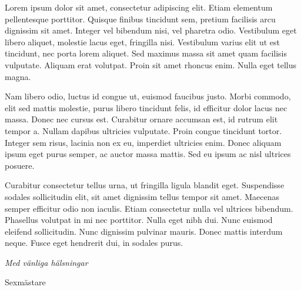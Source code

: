 \documentclass[../main/handlingar.tex]{subfiles}
\begin{document}

Lorem ipsum dolor sit amet, consectetur adipiscing elit. Etiam elementum pellentesque porttitor. Quisque finibus tincidunt sem, pretium facilisis arcu dignissim sit amet. Integer vel bibendum nisi, vel pharetra odio. Vestibulum eget libero aliquet, molestie lacus eget, fringilla nisi. Vestibulum varius elit ut est tincidunt, nec porta lorem aliquet. Sed maximus massa sit amet quam facilisis vulputate. Aliquam erat volutpat. Proin sit amet rhoncus enim. Nulla eget tellus magna.

Nam libero odio, luctus id congue ut, euismod faucibus justo. Morbi commodo, elit sed mattis molestie, purus libero tincidunt felis, id efficitur dolor lacus nec massa. Donec nec cursus est. Curabitur ornare accumsan est, id rutrum elit tempor a. Nullam dapibus ultricies vulputate. Proin congue tincidunt tortor. Integer sem risus, lacinia non ex eu, imperdiet ultricies enim. Donec aliquam ipsum eget purus semper, ac auctor massa mattis. Sed eu ipsum ac nisl ultrices posuere.

Curabitur consectetur tellus urna, ut fringilla ligula blandit eget. Suspendisse sodales sollicitudin elit, sit amet dignissim tellus tempor sit amet. Maecenas semper efficitur odio non iaculis. Etiam consectetur nulla vel ultrices bibendum. Phasellus volutpat in mi nec porttitor. Nulla eget nibh dui. Nunc euismod eleifend sollicitudin. Nunc dignissim pulvinar mauris. Donec mattis interdum neque. Fusce eget hendrerit dui, in sodales purus.

\begin{signatures}{1}
    \emph{Med vänliga hälsningar}
    \signature{Martin Gemborn Nilsson}{Sexmästare}
\end{signatures}
\end{document}
